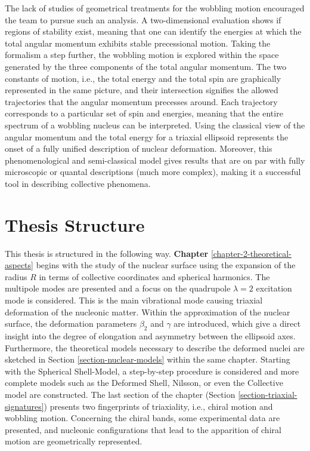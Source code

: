 The lack of studies of geometrical treatments for the wobbling motion encouraged the team to pursue such an analysis. A two-dimensional evaluation shows if regions of stability exist, meaning that one can identify the energies at which the total angular momentum exhibits stable precessional motion. Taking the formalism a step further, the wobbling motion is explored within the space generated by the three components of the total angular momentum. The two constants of motion, i.e., the total energy and the total spin are graphically represented in the same picture, and their intersection signifies the allowed trajectories that the angular momentum precesses around. Each trajectory corresponds to a particular set of spin and energies, meaning that the entire spectrum of a wobbling nucleus can be interpreted. Using the classical view of the angular momentum and the total energy for a triaxial ellipsoid represents the onset of a fully unified description of nuclear deformation. Moreover, this phenomenological and semi-classical model gives results that are on par with fully microscopic or quantal descriptions (much more complex), making it a successful tool in describing collective phenomena.

\section{Thesis Structure}

This thesis is structured in the following way. \textbf{Chapter} \ref{chapter-2-theoretical-aspects} begins with the study of the nuclear surface using the expansion of the radius $R$ in terms of collective coordinates and spherical harmonics. The multipole modes are presented and a focus on the quadrupole $\lambda=2$ excitation mode is considered. This is the main vibrational mode causing triaxial deformation of the nucleonic matter. Within the approximation of the nuclear surface, the deformation parameters $\beta_2$ and $\gamma$ are introduced, which give a direct insight into the degree of elongation and asymmetry between the ellipsoid axes. Furthermore, the theoretical models necessary to describe the deformed nuclei are sketched in Section \ref{section-nuclear-models} within the same chapter. Starting with the Spherical Shell-Model, a step-by-step procedure is considered and more complete models such as the Deformed Shell, Nilsson, or even the Collective model are constructed. The last section of the chapter (Section \ref{section-triaxial-signatures}) presents two fingerprints of triaxiality, i.e., chiral motion and wobbling motion. Concerning the chiral bands, some experimental data are presented, and nucleonic configurations that lead to the apparition of chiral motion are geometrically represented. 

